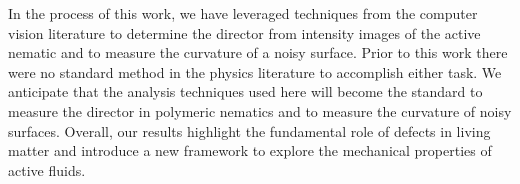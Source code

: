 In the process of this work, we have leveraged techniques from the computer vision literature to determine the director from intensity images of the active nematic and to measure the curvature of a noisy surface.
Prior to this work there were no standard method in the physics literature to accomplish either task.
We anticipate that the analysis techniques used here will become the standard to measure the director in polymeric nematics and to measure the curvature of noisy surfaces.
Overall, our results highlight the fundamental role of defects in living matter and introduce a new framework to explore the mechanical properties of active fluids.
